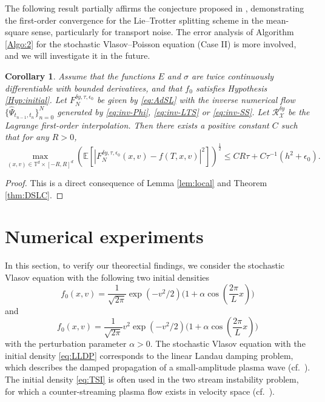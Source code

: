 \documentclass[11pt,reqno]{amsproc}
\newtheorem{corollary}[Def]{Corollary}
\numberwithin{equation}{section}
\newcommand{\E}{\mathbb{E}}\allowdisplaybreaks[4]
\begin{document}
The following result partially affirms the conjecture proposed in \cite{BC24}, demonstrating the first-order convergence for the Lie–Trotter splitting scheme in the mean-square sense, particularly for transport noise. The error analysis of Algorithm \ref{Algo:2} for the stochastic Vlasov–Poisson equation (Case II) is more involved, and we will investigate it in the future. 
\begin{corollary}\label{coro:concrete}
Assume that the functions $E$ and $\sigma$ are twice continuously differentiable with bounded derivatives, and that
$f_0$ satisfies Hypothesis \ref{Hyp:initial}. 
Let $F^{\delta y,\tau,\epsilon_0}_N$ be given by \eqref{eq:AdSL} with 
the inverse numerical flow $\{\widehat{\Psi}_{t_{n-1},t_n}\}_{n=0}^N$ generated by  \eqref{eq:inv-Phi}, \eqref{eq:inv-LTS} or \eqref{eq:inv-SS}.  Let $\mathscr{R}_{\mathscr{X}}^{\delta y}$
be the Lagrange first-order interpolation.
Then there exists a positive constant $C$ such that for any $R>0$,
\begin{equation*}
\max_{(x,v)\in\mathbb{T}^d\times [-R,R]^d}\left(\E\left[|F^{\delta y,\tau,\epsilon_0}_N(x,v)-f(T,x,v)|^2\right]\right)^{\frac12}\le CR \tau +C\tau^{-1}(h^2+\epsilon_0).
\end{equation*}
\end{corollary}

\begin{proof}
This is a direct consequence of Lemma \ref{lem:local} and Theorem \ref{thm:DSLC}.
\end{proof}

\section{Numerical experiments}\label{S:NE}
In this section, to verify our theorectial findings, we consider the stochastic Vlasov equation with the following two initial densities
\begin{equation}\label{eq:LLDP}
f_0(x,v)=\frac{1}{\sqrt{2\pi}}\exp(-v^2/2)\Big(1+\alpha \cos(\frac{2\pi}{L}x)\Big)
\end{equation}
and
\begin{equation}\label{eq:TSI}
f_0(x,v)=\frac{1}{\sqrt{2\pi}}v^2\exp(-v^2/2)\Big(1+\alpha \cos(\frac{2\pi}{L}x)\Big)
\end{equation}
with the perturbation parameter $\alpha>0$. The stochastic Vlasov equation with the initial density
\eqref{eq:LLDP} corresponds to the linear Landau damping problem, which describes the damped propagation of a small-amplitude plasma wave (cf.\ \cite{CMS10}). 
The initial density \eqref{eq:TSI} is often used in the two stream instability problem, 
 for which a counter-streaming plasma flow exists in velocity space (cf.\ \cite{MCV17}). 
\end{document}
